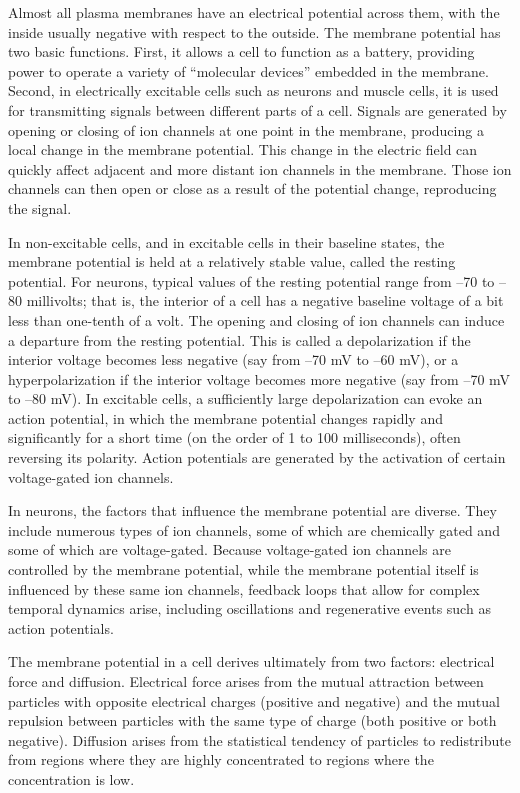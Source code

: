 \documentclass[]{book}
\begin{document}
Almost all plasma membranes have an electrical potential across them, with the inside usually negative with respect to the outside. The membrane potential has two basic functions. First, it allows a cell to function as a battery, providing power to operate a variety of ``molecular devices'' embedded in the membrane. Second, in electrically excitable cells such as neurons and muscle cells, it is used for transmitting signals between different parts of a cell. Signals are generated by opening or closing of ion channels at one point in the membrane, producing a local change in the membrane potential. This change in the electric field can quickly affect adjacent and more distant ion channels in the membrane. Those ion channels can then open or close as a result of the potential change, reproducing the signal.

In non-excitable cells, and in excitable cells in their baseline states, the membrane potential is held at a relatively stable value, called the resting potential. For neurons, typical values of the resting potential range from --70 to --80 millivolts; that is, the interior of a cell has a negative baseline voltage of a bit less than one-tenth of a volt. The opening and closing of ion channels can induce a departure from the resting potential. This is called a depolarization if the interior voltage becomes less negative (say from --70 mV to --60 mV), or a hyperpolarization if the interior voltage becomes more negative (say from --70 mV to --80 mV). In excitable cells, a sufficiently large depolarization can evoke an action potential, in which the membrane potential changes rapidly and significantly for a short time (on the order of 1 to 100 milliseconds), often reversing its polarity. Action potentials are generated by the activation of certain voltage-gated ion channels.

In neurons, the factors that influence the membrane potential are diverse. They include numerous types of ion channels, some of which are chemically gated and some of which are voltage-gated. Because voltage-gated ion channels are controlled by the membrane potential, while the membrane potential itself is influenced by these same ion channels, feedback loops that allow for complex temporal dynamics arise, including oscillations and regenerative events such as action potentials.

The membrane potential in a cell derives ultimately from two factors: electrical force and diffusion. Electrical force arises from the mutual attraction between particles with opposite electrical charges (positive and negative) and the mutual repulsion between particles with the same type of charge (both positive or both negative). Diffusion arises from the statistical tendency of particles to redistribute from regions where they are highly concentrated to regions where the concentration is low.
\end{document}
